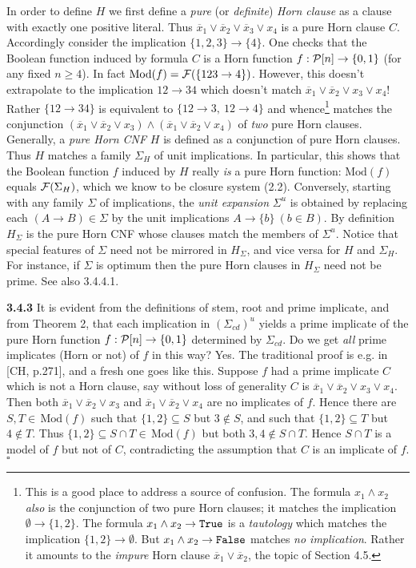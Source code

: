 \documentclass[11pt]{article}
\newcommand{\ol}{\overline}
\newcommand{\ra}{\rightarrow}
\begin{document}
In order to define $H$ we first define a {\it pure} (or {\it definite}) {\it Horn clause} as a clause with exactly one positive literal.
 Thus $\ol{x}_1 \vee \ol{x}_2 \vee \ol{x}_3 \vee x_4$ is a pure Horn clause $C$. Accordingly consider the implication $\{1,2,3\} \ra \{4\}$. One checks that the Boolean function induced by formula $C$ is a Horn function $f: {\cal P}[n] \ra \{0,1\}$ (for any fixed $n \geq 4$). In fact $\mbox{Mod}(f)  = {\cal F} (\{123 \ra 4\})$. However, this doesn't extrapolate to the implication $12 \ra 34$ which doesn't match $\ol{x}_1 \vee \ol{x}_2 \vee x_3 \vee x_4$! Rather  $\{12 \ra 34\}$ is equivalent to $\{12 \ra 3, \ 12 \ra 4\}$ and whence\footnote{This is a good place to address a source of confusion. The formula $x_1 \wedge x_2$ {\it also} is the conjunction of two pure Horn clauses; it matches the implication $\emptyset \ra \{1,2\}$. The formula $x_1 \wedge x_2 \ra {\tt True}$ is a {\it tautology} which matches the implication $\{1,2\} \ra \emptyset$. But $x_1 \wedge x_2 \ra {\tt False}$ matches {\it no implication}. Rather it amounts to the {\it impure} Horn clause $\ol{x}_1 \vee \ol{x}_2$, the topic of Section 4.5.} matches the conjunction $(\ol{x}_1 \vee \ol{x}_2 \vee x_3) \wedge (\ol{x}_1 \vee \ol{x}_2 \vee x_4)$ of {\it two} pure Horn clauses. Generally, a {\it pure Horn CNF} $H$ is defined as a conjunction of  pure Horn clauses. Thus $H$ matches a family $\Sigma_H$ of unit implications. In particular, this shows that the Boolean function $f$ induced by $H$ really {\it is} a pure Horn function: $\mbox{Mod}(f)$ equals ${\cal F}(\Sigma_H)$, which we know to be  closure system (2.2). Conversely, starting with any family $\Sigma$ of implications, the {\it unit expansion} $\Sigma^u$ is obtained by replacing each $(A \ra B) \in \Sigma$ by the unit implications $A \ra \{b\} \ (b \in B)$. By definition $H_\Sigma$ is the pure Horn CNF whose clauses match the members of $\Sigma^u$. Notice that special features of $\Sigma$ need not be mirrored in $H_\Sigma$, and vice versa for $H$ and $\Sigma_H$.
 For instance, if $\Sigma$ is optimum then the pure Horn clauses in $H_\Sigma$ need not  be prime. See also 3.4.4.1. 
 

{\bf 3.4.3} It is evident from the definitions of stem, root and prime implicate, and from Theorem 2, that each implication in $(\Sigma_{cd})^u$ yields a prime implicate of the pure Horn function $f : {\cal P}[n] \ra \{0,1\}$ determined by $\Sigma_{cd}$. Do we get {\it all} prime implicates (Horn or not) of $f$ in this way? Yes. The traditional proof is e.g. in [CH, p.271], and a fresh one goes like this.
Suppose  $f$ had a prime implicate $C$ which is not a Horn clause, say without loss of generality $C$ is $\ol{x}_1 \vee \ol{x}_2 \vee  x_3 \vee x_4$. Then both $\ol{x}_1 \vee \ol{x}_2 \vee x_3$ and $\ol{x}_1 \vee \ol{x}_2 \vee x_4$ are no implicates of $f$. Hence there are $S, T \in \, \mbox{Mod}(f)$ such that $\{1, 2\} \subseteq S$ but $3 \not\in S$, and such that $\{1,2\} \subseteq T$ but $4 \not\in T$. Thus $\{1,2\} \subseteq S \cap T \in \, \mbox{Mod}(f)$ but both $3,4 \not\in S \cap T$. Hence $S \cap T$ is a model of $f$ but not of $C$, contradicting the assumption that $C$ is an implicate of $f$. \quad $\square$
\end{document}
